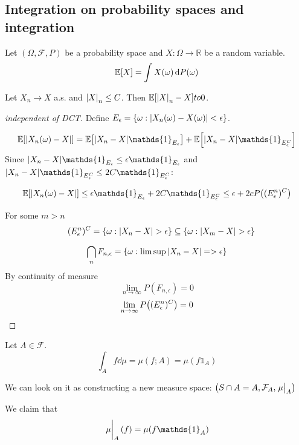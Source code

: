 \subsection{Integration on probability spaces and integration}
\begin{definition}[Expectation]
	Let $(\Omega, \mathcal{F}, P)$ be a probability space and $X: \Omega \to \mathbb{R}$ be a random variable.
	$$\mathbb{E}\qty[X] =  \int X(\omega) \dd{P(\omega)}$$
\end{definition}
\begin{theorem} \label{bct}
	Let $X_n \to X$ a.s. and $\abs{X}_n \leq C$. Then $\mathbb{E} \qty[\abs{X}_n-X] to 0$.
	\begin{proof}[independent of DCT]
		Define $E_{\epsilon} = \left\{ \omega : \abs{X_n(\omega) - X(\omega)} < \epsilon \right\}$.
		
		$$\mathbb{E} \qty[\abs{X_n(\omega) -X}] = \mathbb{E} \qty[\abs{X_n - X} \mathds{1}_{E_\epsilon}]+\mathbb{E} \qty[\abs{X_n - X} \mathds{1}_{E_\epsilon^C}]$$
		Since $\abs{X_n - X} \mathds{1}_{E_\epsilon} \leq \epsilon \mathds{1}_{E_\epsilon}$ and $\abs{X_n - X} \mathds{1}_{E_\epsilon^C} \leq 2C \mathds{1}_{E_\epsilon^C}$:
		
		$$\mathbb{E} \qty[\abs{X_n(\omega) -X}] \leq \epsilon \mathds{1}_{E_\epsilon} + 2C \mathds{1}_{E_\epsilon^C} \leq \epsilon + 2c P\qty((E_\epsilon^n)^C) $$
		
		For some $m>n$
		$$\quad (E_\epsilon^n)^C = \left\{ \omega : \abs{X_n - X} >\epsilon \right\} \subseteq  \left\{ \omega : \abs{X_m - X} >\epsilon \right\}$$
		
		$$ \bigcap_n F_{n,\epsilon} = \left\{ \omega : \limsup \abs{X_n -X} => \epsilon \right\}$$
		By continuity of measure
		$$\lim_{n\to \infty} P(F_{n,\epsilon}) =0$$
		$$\lim_{n\to \infty} P\qty((E_\epsilon^n)^C)  =0$$
	\end{proof}
\end{theorem}

\begin{definition}
	Let $A\in \mathcal{F}$. 
	$$\int_A f \dd{\mu} = \mu(f;A) = \mu(f\mathds{1}_A)$$
	
	We can look on it as constructing a new measure space:
	$\qty(S\cap A = A, \mathcal{F}_A, \eval{\mu}_A)$
	
	We claim that 
	$$\eval{\mu}_A (f)= \mu (f\mathds{1}_A)$$
\end{definition}

